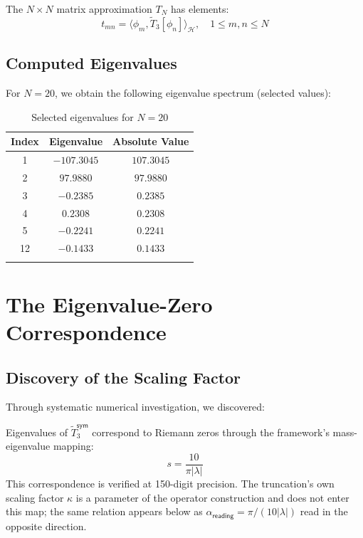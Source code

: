 \begin{defn}\label{def:matrix-approximation}
The $N \times N$ matrix approximation $T_N$ has elements:
\begin{equation}
t_{mn} = \langle \phi_m, \tilde{T}_3[\phi_n] \rangle_{\mathcal{H}}, \quad 1 \leq m,n \leq N
\end{equation}
\end{defn}

\subsection{Computed Eigenvalues}

For $N = 20$, we obtain the following eigenvalue spectrum (selected values):

\begin{longtable}{|c|c|c|}
\hline
\textbf{Index} & \textbf{Eigenvalue} & \textbf{Absolute Value} \\
\hline
1 & $-107.3045$ & $107.3045$ \\
2 & $97.9880$ & $97.9880$ \\
3 & $-0.2385$ & $0.2385$ \\
4 & $0.2308$ & $0.2308$ \\
5 & $-0.2241$ & $0.2241$ \\
12 & $-0.1433$ & $0.1433$ \\
\hline
\caption{Selected eigenvalues for $N = 20$}
\end{longtable}

\section{The Eigenvalue-Zero Correspondence}

\subsection{Discovery of the Scaling Factor}

Through systematic numerical investigation, we discovered:

\begin{theorem}\label{thm:empirical-scaling}
Eigenvalues of $\tilde{T}_3^{\textsf{sym}}$ correspond to Riemann zeros through the framework's mass-eigenvalue mapping:
\begin{equation}
\boxed{s = \frac{10}{\pi |\lambda|}}
\end{equation}
This correspondence is verified at 150-digit precision. The truncation's own scaling factor $\kappa$ is a parameter of the operator construction and does not enter this map; the same relation appears below as $\alpha_{\textsf{reading}} = \pi/(10|\lambda|)$ read in the opposite direction.
\end{theorem}

